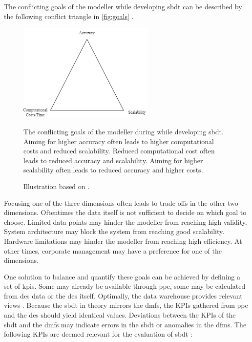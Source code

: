 The conflicting goals of the modeller while developing \gls{sbdt} can be described by the following conflict triangle in \autoref{fig:goals} \autocite{robinson2014simulation,balci2012life}.

\begin{figure}[htbp]
    \centering
    \includegraphics[width=0.6\textwidth]{figures/goals.png}
    \caption[Conflict Triangle]{The conflicting goals of the modeller during while developing \gls{sbdt}. Aiming for higher accuracy often leads to higher computational costs and reduced scalability. Reduced computational cost often leads to reduced accuracy and scalability. Aiming for higher scalability often leads to reduced accuracy and higher costs.}
    \label{fig:goals}
    \caption*{Illustration based on \textcite{robinson2014simulation,balci2012life}.}
\end{figure}

Focusing one of the three dimensions often leads to trade-offs in the other two dimensions. Oftentimes the data itself is not sufficient to decide on which goal to choose. Limited data points may hinder the modeller from reaching high validity. System architecture may block the system from reaching good scalability. Hardware limitations may hinder the modeller from reaching high efficiency.
At other times, corporate management may have a preference for one of the dimensions.

One solution to balance and quantify these goals can be achieved by defining a set of \gls{kpi}s. Some may already be available through \gls{ppc}, some may be calculated from \gls{des} data or the \gls{des} itself. Optimally, the data warehouse provides relevant views \autocite{cui2020manufacturing}. Because the \gls{sbdt} in theory mirrors the \gls{dmfs}, the KPIs gathered from \gls{ppc} and the \gls{des} should yield identical values. Deviations between the KPIs of the \gls{sbdt} and the \gls{dmfs} may indicate errors in the \gls{sbdt} or anomalies in the \gls{dfms}. The following KPIs are deemed relevant for the evaluation of \gls{sbdt} \autocite{friederich2023framework}:


